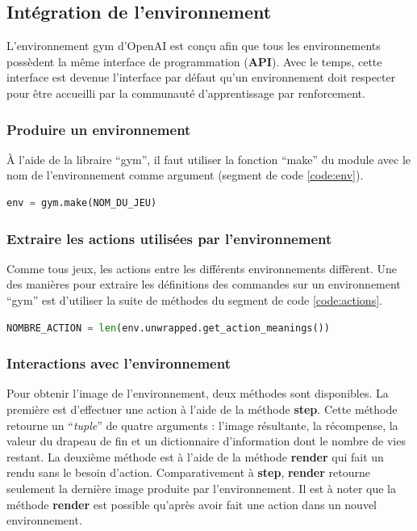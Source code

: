 \documentclass{article}
\begin{document}
\subsection{Intégration de l'environnement}
L'environnement gym d'OpenAI est conçu afin que tous les environnements possèdent la même interface de programmation (\textbf{API}). Avec le temps, cette interface est devenue l'interface par défaut qu'un environnement doit respecter pour être accueilli par la communauté d'apprentissage par renforcement.

\subsubsection{Produire un environnement}
À l'aide de la libraire ``gym'', il faut utiliser la fonction ``make'' du module avec le nom de l'environnement comme argument (segment de code \ref{code:env}).

\bigbreak
\begin{lstlisting}[language=Python, caption={Création de l'environnement}, label={code:env}]
env = gym.make(NOM_DU_JEU)
\end{lstlisting}

\subsubsection{Extraire les actions utilisées par l'environnement}
Comme tous jeux, les actions entre les différents environnements diffèrent. Une des manières pour extraire les définitions des commandes sur un environnement ``gym'' est d'utiliser la suite de méthodes du segment de code \ref{code:actions}.

\bigbreak
\begin{lstlisting}[language=Python, caption={Extraire les actions utilisées par l'environnement}, label={code:actions}]
NOMBRE_ACTION = len(env.unwrapped.get_action_meanings())
\end{lstlisting}

\subsubsection{Interactions avec l'environnement}

Pour obtenir l'image de l'environnement, deux méthodes sont disponibles. La première est d'effectuer une action à l'aide de la méthode \textbf{step}. Cette méthode retourne un ``\textit{tuple}'' de quatre arguments : l'image résultante, la récompense, la valeur du drapeau de fin et un dictionnaire d'information dont le nombre de vies restant. La deuxième méthode est à l'aide de la méthode \textbf{render} qui fait un rendu sans le besoin d'action. Comparativement à \textbf{step}, \textbf{render} retourne seulement la dernière image produite par l'environnement. Il est à noter que la méthode \textbf{render} est possible qu'après avoir fait une action dans un nouvel environnement.
\end{document}
